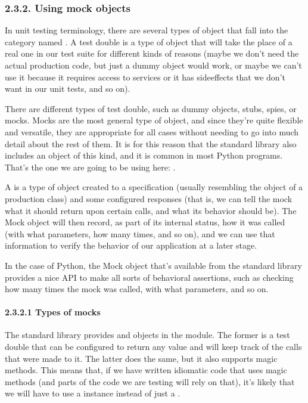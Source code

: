 \documentclass[a4paper,10pt,english]{sphinxmanual}
\begin{document}
\subsubsection{2.3.2. Using mock objects}
\label{\detokenize{chapters/8_unit_testing/index:using-mock-objects}}
In unit testing terminology, there are several types of object that fall into the category
named . A test double is a type of object that will take the place of a real one in
our test suite for different kinds of reasons (maybe we don’t need the actual production
code, but just a dummy object would work, or maybe we can’t use it because it requires
access to services or it has side\sphinxhyphen{}effects that we don’t want in our unit tests, and so on).

There are different types of test double, such as dummy objects, stubs, spies, or mocks.
Mocks are the most general type of object, and since they’re quite flexible and versatile, they
are appropriate for all cases without needing to go into much detail about the rest of them.
It is for this reason that the standard library also includes an object of this kind, and it is
common in most Python programs. That’s the one we are going to be using
here: .

A  is a type of object created to a specification (usually resembling the object of a
production class) and some configured responses (that is, we can tell the mock what it
should return upon certain calls, and what its behavior should be). The Mock object will
then record, as part of its internal status, how it was called (with what parameters, how
many times, and so on), and we can use that information to verify the behavior of our
application at a later stage.

In the case of Python, the Mock object that’s available from the standard library provides a
nice API to make all sorts of behavioral assertions, such as checking how many times the
mock was called, with what parameters, and so on.


\paragraph{2.3.2.1 Types of mocks}
\label{\detokenize{chapters/8_unit_testing/index:types-of-mocks}}
The standard library provides  and  objects in the 
module. The former is a test double that can be configured to return any value and will
keep track of the calls that were made to it. The latter does the same, but it also supports
magic methods. This means that, if we have written idiomatic code that uses magic
methods (and parts of the code we are testing will rely on that), it’s likely that we will have
to use a  instance instead of just a .
\end{document}
